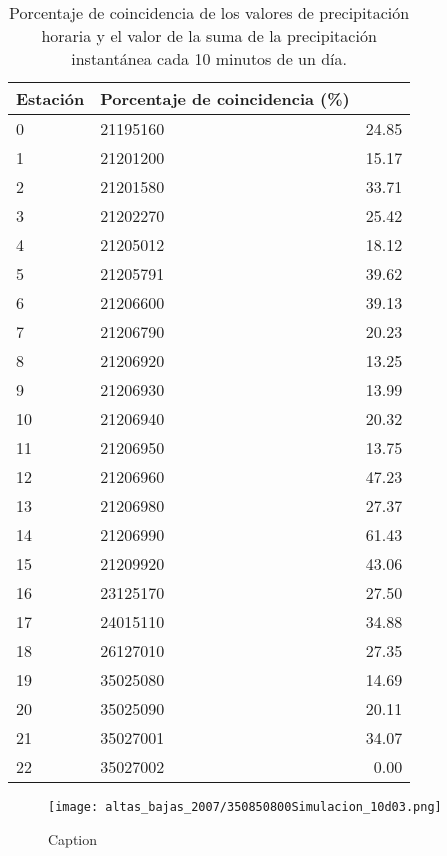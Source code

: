 \begin{table}[H]
\begin{center}
\caption{Porcentaje de coincidencia de los valores de precipitación horaria y el valor de la suma de la precipitación instantánea cada 10 minutos de un día.}
\begin{tabular}{llr}
\toprule
Estación &  Porcentaje de coincidencia (\%) \\
\midrule
0  &  21195160 &     24.85 \\
1  &  21201200 &     15.17 \\
2  &  21201580 &     33.71 \\
3  &  21202270 &     25.42 \\
4  &  21205012 &     18.12 \\
5  &  21205791 &     39.62 \\
6  &  21206600 &     39.13 \\
7  &  21206790 &     20.23 \\
8  &  21206920 &     13.25 \\
9  &  21206930 &     13.99 \\
10 &  21206940 &     20.32 \\
11 &  21206950 &     13.75 \\
12 &  21206960 &     47.23 \\
13 &  21206980 &     27.37 \\
14 &  21206990 &     61.43 \\
15 &  21209920 &     43.06 \\
16 &  23125170 &     27.50 \\
17 &  24015110 &     34.88 \\
18 &  26127010 &     27.35 \\
19 &  35025080 &     14.69 \\
20 &  35025090 &     20.11 \\
21 &  35027001 &     34.07 \\
22 &  35027002 &      0.00 \\
\bottomrule
\end{tabular}

\label{table:compar-porcentaje}
\end{center}
\end{table}

\begin{figure}[H]
    \centering
    \texttt{[image: altas\_bajas\_2007/350850800Simulacion\_10d03.png]}
    \caption{Caption}
    \label{fig:my_label}
\end{figure}

